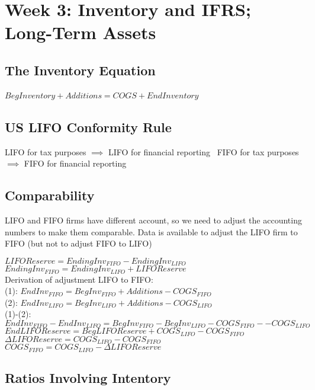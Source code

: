 \section*{Week 3: Inventory and IFRS; Long-Term Assets}

\subsection*{The Inventory Equation}

$BegInventory + Additions = COGS + EndInventory$ \

\subsection*{US LIFO Conformity Rule}
LIFO for tax purposes $\implies$ LIFO for financial reporting \
FIFO for tax purposes $\implies$ FIFO for financial reporting \

\subsection*{Comparability}
LIFO and FIFO firms have different account, so we need to adjust the accounting numbers to make them comparable.  Data is available to adjust the LIFO firm to FIFO (but not to adjust FIFO to LIFO)

$LIFO Reserve = EndingInv_{FIFO} - EndingInv_{LIFO}$ \\
$EndingInv_{FIFO} =  EndingInv_{LIFO} + LIFO Reserve$ \\
Derivation of adjustment LIFO to FIFO:\\
(1): $EndInv_{FIFO} = BegInv_{FIFO} + Additions - COGS_{FIFO}$  \\
(2): $EndInv_{LIFO} = BegInv_{LIFO} + Additions - COGS_{LIFO}$  \\
(1)-(2):\\
$EndInv_{FIFO} -EndInv_{LIFO} = BegInv_{FIFO} - BegInv_{LIFO} - COGS_{FIFO} - - COGS_{LIFO}$ \\
$EndLIFOReserve = BegLIFOReserve+ COGS_{LIFO} - COGS_{FIFO}$ \\
$\Delta LIFOReserve = COGS_{LIFO} - COGS_{FIFO}$ \\

$ COGS_{FIFO} = COGS_{LIFO} - \Delta LIFOReserve  $

\subsection*{Ratios Involving Intentory}

